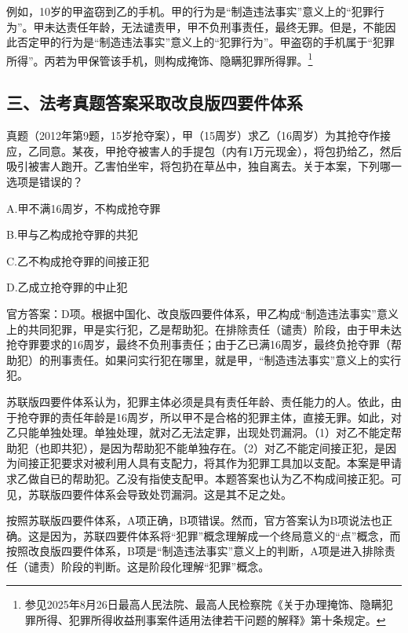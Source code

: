 例如，10岁的甲盗窃到乙的手机。甲的行为是“制造违法事实”意义上的“犯罪行为”。甲未达责任年龄，无法谴责甲，甲不负刑事责任，最终无罪。但是，不能因此否定甲的行为是“制造违法事实”意义上的“犯罪行为”。甲盗窃的手机属于“犯罪所得”。丙若为甲保管该手机，则构成掩饰、隐瞒犯罪所得罪。\footnote{参见2025年8月26日最高人民法院、最高人民检察院《关于办理掩饰、隐瞒犯罪所得、犯罪所得收益刑事案件适用法律若干问题的解释》第十条规定。}

\subsection*{三、法考真题答案采取改良版四要件体系}

真题（2012年第9题，15岁抢夺案），甲（15周岁）求乙（16周岁）为其抢夺作接应，乙同意。某夜，甲抢夺被害人的手提包（内有1万元现金），将包扔给乙，然后吸引被害人跑开。乙害怕坐牢，将包扔在草丛中，独自离去。关于本案，下列哪一选项是错误的？

A.甲不满16周岁，不构成抢夺罪

B.甲与乙构成抢夺罪的共犯

C.乙不构成抢夺罪的间接正犯

D.乙成立抢夺罪的中止犯

官方答案：D项。根据中国化、改良版四要件体系，甲乙构成“制造违法事实”意义上的共同犯罪，甲是实行犯，乙是帮助犯。在排除责任（谴责）阶段，由于甲未达抢夺罪要求的16周岁，最终不负刑事责任；由于乙已满16周岁，最终负抢夺罪（帮助犯）的刑事责任。如果问实行犯在哪里，就是甲，“制造违法事实”意义上的实行犯。

苏联版四要件体系认为，犯罪主体必须是具有责任年龄、责任能力的人。依此，由于抢夺罪的责任年龄是16周岁，所以甲不是合格的犯罪主体，直接无罪。如此，对乙只能单独处理。单独处理，就对乙无法定罪，出现处罚漏洞。（1）对乙不能定帮助犯（也即共犯），是因为帮助犯不能单独存在。（2）对乙不能定间接正犯，是因为间接正犯要求对被利用人具有支配力，将其作为犯罪工具加以支配。本案是甲请求乙做自已的帮助犯。乙没有指使支配甲。本题答案也认为乙不构成间接正犯。可见，苏联版四要件体系会导致处罚漏洞。这是其不足之处。

按照苏联版四要件体系，A项正确，B项错误。然而，官方答案认为B项说法也正确。这是因为，苏联四要件体系将“犯罪”概念理解成一个终局意义的“点”概念，而按照改良版四要件体系，B项是“制造违法事实”意义上的判断，A项是进入排除责任（谴责）阶段的判断。这是阶段化理解“犯罪”概念。


